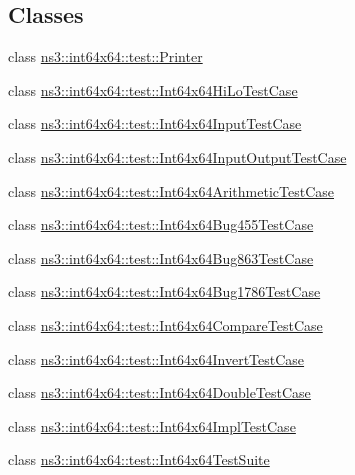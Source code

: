 \subsection*{Classes}
\begin{DoxyCompactItemize}
\item 
class \hyperlink{classns3_1_1int64x64_1_1test_1_1Printer}{ns3\+::int64x64\+::test\+::\+Printer}
\item 
class \hyperlink{classns3_1_1int64x64_1_1test_1_1Int64x64HiLoTestCase}{ns3\+::int64x64\+::test\+::\+Int64x64\+Hi\+Lo\+Test\+Case}
\item 
class \hyperlink{classns3_1_1int64x64_1_1test_1_1Int64x64InputTestCase}{ns3\+::int64x64\+::test\+::\+Int64x64\+Input\+Test\+Case}
\item 
class \hyperlink{classns3_1_1int64x64_1_1test_1_1Int64x64InputOutputTestCase}{ns3\+::int64x64\+::test\+::\+Int64x64\+Input\+Output\+Test\+Case}
\item 
class \hyperlink{classns3_1_1int64x64_1_1test_1_1Int64x64ArithmeticTestCase}{ns3\+::int64x64\+::test\+::\+Int64x64\+Arithmetic\+Test\+Case}
\item 
class \hyperlink{classns3_1_1int64x64_1_1test_1_1Int64x64Bug455TestCase}{ns3\+::int64x64\+::test\+::\+Int64x64\+Bug455\+Test\+Case}
\item 
class \hyperlink{classns3_1_1int64x64_1_1test_1_1Int64x64Bug863TestCase}{ns3\+::int64x64\+::test\+::\+Int64x64\+Bug863\+Test\+Case}
\item 
class \hyperlink{classns3_1_1int64x64_1_1test_1_1Int64x64Bug1786TestCase}{ns3\+::int64x64\+::test\+::\+Int64x64\+Bug1786\+Test\+Case}
\item 
class \hyperlink{classns3_1_1int64x64_1_1test_1_1Int64x64CompareTestCase}{ns3\+::int64x64\+::test\+::\+Int64x64\+Compare\+Test\+Case}
\item 
class \hyperlink{classns3_1_1int64x64_1_1test_1_1Int64x64InvertTestCase}{ns3\+::int64x64\+::test\+::\+Int64x64\+Invert\+Test\+Case}
\item 
class \hyperlink{classns3_1_1int64x64_1_1test_1_1Int64x64DoubleTestCase}{ns3\+::int64x64\+::test\+::\+Int64x64\+Double\+Test\+Case}
\item 
class \hyperlink{classns3_1_1int64x64_1_1test_1_1Int64x64ImplTestCase}{ns3\+::int64x64\+::test\+::\+Int64x64\+Impl\+Test\+Case}
\item 
class \hyperlink{classns3_1_1int64x64_1_1test_1_1Int64x64TestSuite}{ns3\+::int64x64\+::test\+::\+Int64x64\+Test\+Suite}
\end{DoxyCompactItemize}
